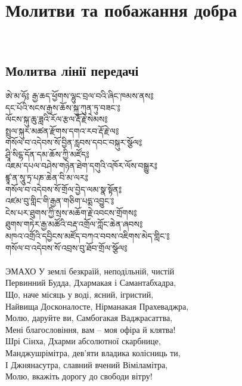 \section{Молитви та побажання добра}
\\
\subsection{Молитва лінії передачі}
\vspace{0.5cm}
\ti
ཨེ་མ་ཧོ༔ རྒྱ་ཆད་ཕྱོགས་ལྷུང་བྲལ་བའི་ཞིང་ཁམས་ནས༔ \\
དང་པོའི་སངས་རྒྱས་ཆོས་སྐུ་ཀུན་ཏུ་བཟང་༔ \\
ལོངས་སྐུ་ཆུ་ཟླའི་རོལ་རྩལ་རྡོ་རྗེ་སེམས༔ \\
སྤྲུལ་སྐུར་མཚན་རྫོགས་དགའ་རབ་རྡོ་རྗེ་ལ༔ \\
གསོལ་བ་འདེབས་སོ་བྱིན་རླབས་དབང་བསྐུར་སྩོལ༔ \\
ཤྲཱི་སིངྷ་དོན་དམ་ཆོས་ཀྱི་མཛོད༔ \\
འཇམ་དཔལ་བཤེས་གཉེན་ཐེག་དགུའི་འཁོར་ལོས་བསྒྱུར༔ \\
ཛྙཱ་ན་སཱུ་ཏྲ་པཎ་ཆེན་བི་མ་ལར༔ \\
གསོལ་བ་འདེབས་སོ་གྲོལ་བྱེད་ལམ་སྣ་སྟོན༔ \\
འཛམ་བུ་གླིང་གི་རྒྱན་གཅིག་པདྨ་འབྱུང་༔ \\
ངེས་པར་ཐུགས་ཀྱི་སྲས་མཆོག་རྗེ་འབངས་གྲོགས༔ \\
ཐུགས་གཏེར་རྒྱ་མཚོའི་བརྡ་འགྲོལ་ཀློང་ཆེན་ཞབས༔ \\
མཁའ་འགྲོའི་དབྱིངས་མཛོད་བཀའ་བབས་འཇིགས་མེད་གླིང་༔ \\
གསོལ་བ་འདེབས་སོ་འབྲས་བུ་ཐོབ་གྲོལ་སྩོལ༔ \\
\\
\ru
ЭМАХО У землі безкраїй, неподільній, чистій\\
Первинний Будда, Дхармакая і Самантабхадра,\\
Що, наче місяць у воді, ясний, ігристий,\\
Найвища Досконалосте, Нірманакая Прахеваджра,\\
Молю, даруйте ви, Самбогакая Ваджрасаттва,\\
Мені благословіння, вам -- моя офіра й клятва!\\
Шрі Сінха, Дхарми абсолютної скарбнице,\\
Манджушрімітра, дев'яти владика колісниць ти,\\
І Джнянасутра, славний вчений Віміламітра,\\
Молю, вкажіть дорогу до свободи вітру!\\

